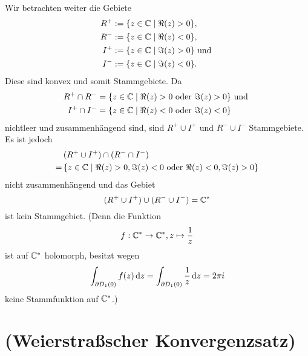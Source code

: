 \documentclass[a4paper,10pt]{article}
\begin{document}
Wir betrachten weiter die Gebiete
\begin{align*}
 R^+ &:= \{z \in \mathbb{C} \mid \Re(z) > 0\}, \\
 R^- &:= \{z \in \mathbb{C} \mid \Re(z) < 0\}, \\
 I^+ &:= \{z \in \mathbb{C} \mid \Im(z) > 0\} \text{ und } \\
 I^- &:= \{z \in \mathbb{C} \mid \Im(z) < 0\}.
\end{align*}
Diese sind konvex und somit Stammgebiete. Da
\begin{align*}
 R^+ \cap R^- &= \{z \in \mathbb{C} \mid \Re(z) > 0 \text{ oder } \Im(z) > 0\} \text{ und } \\
 I^+ \cap I^- &= \{z \in \mathbb{C} \mid \Re(z) < 0 \text{ oder } \Im(z) < 0\}
\end{align*}
nichtleer und zusammenhängend sind, sind $R^+ \cup I^+$ und $R^- \cup I^-$ Stammgebiete. Es ist jedoch
\begin{align*}
  &\, (R^+ \cup I^+) \cap (R^- \cap I^-) \\
 =&\,  \{z \in \mathbb{C} \mid \Re(z) > 0, \Im(z) < 0 \text{ oder } \Re(z) < 0, \Im(z) > 0\}
\end{align*}
nicht zusammenhängend und das Gebiet
\[
 (R^+ \cup I^+) \cup (R^- \cup I^-) = \mathbb{C}^*
\]
ist kein Stammgebiet. (Denn die Funktion
\[
 f : \mathbb{C}^* \to \mathbb{C}^*, z \mapsto \frac{1}{z}
\]
ist auf $\mathbb{C}^*$ holomorph, besitzt wegen
\[
 \int_{\partial D_1(0)} f(z) \,\text{d}z
 = \int_{\partial D_1(0)} \frac{1}{z} \,\text{d}z
 = 2 \pi i
\]
keine Stammfunktion auf $\mathbb{C}^*$.)





\section{(Weierstraßscher Konvergenzsatz)}
\end{document}
